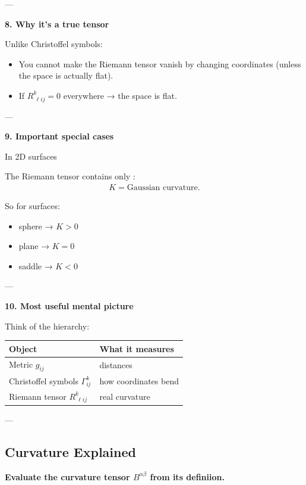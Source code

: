 \documentclass[12pt,a4paper]{report}
\begin{document}
\begin{description}
\begin{description}
---

\item \textbf{8. Why it’s a true tensor}

Unlike Christoffel symbols:

\begin{itemize}
\item You cannot make the Riemann tensor vanish by changing coordinates (unless the space is actually flat).
\item If $R^k_{\ \ell ij} = 0$ everywhere → the space is flat.
\end{itemize}

---

\item \textbf{9. Important special cases}

In 2D surfaces

The Riemann tensor contains only :
\begin{align*}
K = \text{Gaussian curvature}.
\end{align*}

So for surfaces:

\begin{itemize}
\item sphere → $K>0$
\item plane → $K=0$
\item saddle → $K<0$
\end{itemize}

---

\item \textbf{10. Most useful mental picture}

Think of the hierarchy:

\begin{tabular}{|l|l|}
\hline
 Object                              & What it measures     \\
\hline
 Metric $g_{ij}$                     & distances            \\
 Christoffel symbols $\Gamma^k_{ij}$ & how coordinates bend \\
 Riemann tensor $R^k_{\ \ell ij}$    & real curvature       \\
\hline
\end{tabular}
---

\newpage
\subsection*{Curvature Explained}
\item \textbf{Evaluate the curvature tensor $B^{\alpha\beta}$ from its definiion.}


\end{description}
\end{description}
\end{document}
